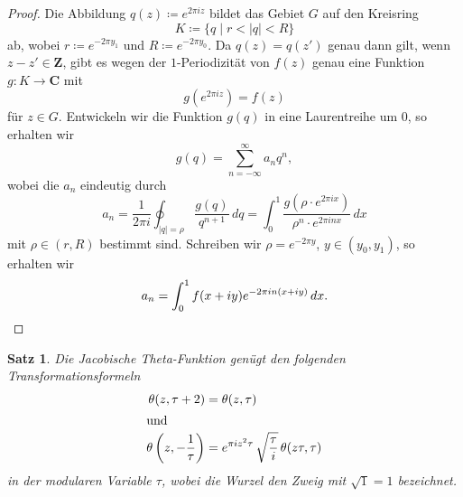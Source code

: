 \documentclass[a4paper,twoside,openright]{report}
\newtheorem{thm}{Satz}[chapter]
\theoremstyle{definition}
\theoremstyle{remark}
\begin{document}
\begin{proof}
  Die Abbildung $q(z) \coloneqq e^{2 \pi i z}$ bildet das Gebiet $G$ auf den Kreisring
  \[
    K \coloneqq \{q \mid r < |q| < R\}
  \]
  ab, wobei $r \coloneqq e^{- 2 \pi y_1}$ und $R \coloneqq e^{- 2 \pi y_0}$.
  Da $q(z) = q(z')$ genau dann gilt, wenn $z - z' \in \mathbf Z$, gibt es
  wegen der $1$-Periodizität von $f(z)$ genau
  eine Funktion $g\colon K \to \mathbf C$ mit
  \[
    g(e^{2 \pi i z}) = f(z)
  \]
  für $z \in G$. Entwickeln wir die Funktion $g(q)$ in eine Laurentreihe um $0$,
  so erhalten wir
  \[
    g(q) = \sum_{n = -\infty}^\infty a_n q^n,
  \]
  wobei die $a_n$ eindeutig durch
  \[
    a_n = \frac 1 {2 \pi i} \oint_{|q| = \rho} \frac{g(q)}{q^{n + 1}} \, d q
    = \int_0^1 \frac{g(\rho \cdot e^{2 \pi i x})}{\rho^n \cdot e^{2 \pi i n x}} \, dx
  \]
  mit $\rho \in (r, R)$ bestimmt sind. Schreiben wir $\rho = e^{-2 \pi y}$, $y \in (y_0, y_1)$,
  so erhalten wir
  \[
    a_n = \int_0^1 f(x + i y) e^{- 2 \pi i n (x + i y)} \, dx.
    \qedhere
  \]
\end{proof}

\begin{thm}
  Die Jacobische Theta-Funktion genügt den folgenden Transformationsformeln
  \begin{align*}
    \theta(z, \tau + 2) & = \theta(z, \tau) \\
    \intertext{und}
    \theta\left(z, - \frac 1 \tau\right) & = e^{\pi i z^2 \tau} \, \sqrt{\frac \tau i} \, \theta(z \tau, \tau)
  \end{align*}
  in der modularen Variable $\tau$, wobei die Wurzel den Zweig mit $\sqrt 1 = 1$
  bezeichnet.
\end{thm}
\end{document}
